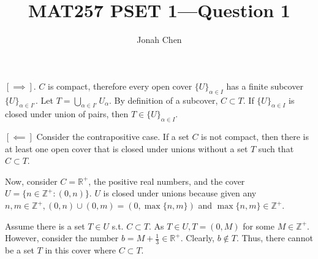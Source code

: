 \documentclass{exam}
\title{MAT257 PSET 1---Question 1}
\author{Jonah Chen}
\numberwithin{equation}{section}
\newcommand{\R}{\mathbb{R}}
\begin{document}
    \sffamily
    $[\implies]$. $C$ is compact, therefore every open cover $\{U\}_{\alpha\in I}$ has a finite subcover $\{U\}_{\alpha\in I'}$. Let $T=\bigcup_{\alpha\in I'}U_{\alpha}$. By definition of a subcover, $C\subset T$.  If $\{U\}_{\alpha\in I}$ is closed under union of pairs, then $T\in \{U\}_{\alpha \in I}$. 

    $[\impliedby]$ Consider the contrapositive case. If a set $C$ is not compact, then there is at least one open cover that is closed under unions without a set $T$ such that $C\subset T$. 

    Now, consider $C=\R^+$, the positive real numbers, and the cover $U=\{n\in\mathbb Z^+:(0,n)\}$. $U$ is closed under unions because given any $n,m\in\mathbb Z^+, (0,n)\cup(0,m)=(0,\max\{n,m\})$ and $\max\{n,m\}\in\mathbb Z^+$. 
    
    Assume there is a set $T\in U$ s.t. $C\subset T$. As $T\in U, T=(0,M)$ for some $M\in\mathbb Z^+$. However, consider the number $b=M+\frac{1}{3}\in\R^+$. Clearly, $b\notin T$. Thus, there cannot be a set $T$ in this cover where $C\subset T$. 
\end{document}
